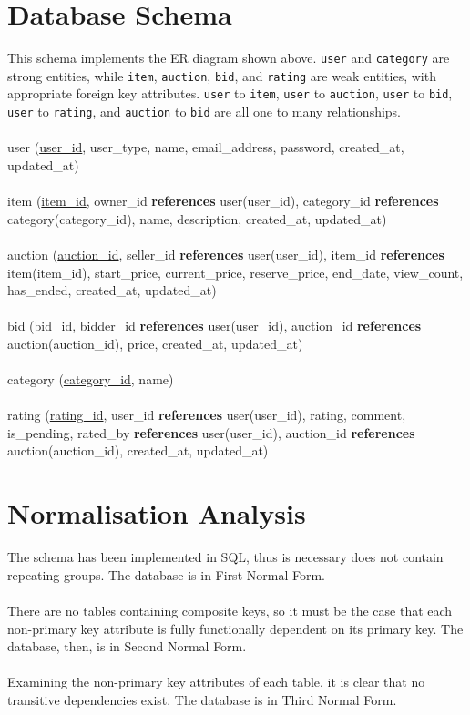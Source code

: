 \documentclass{article}
\begin{document}
\section{Database Schema}

This schema implements the ER diagram shown above. \texttt{user} and \texttt{category} are strong entities, while \texttt{item}, \texttt{auction}, \texttt{bid}, and \texttt{rating} are weak entities, with appropriate foreign key attributes. \texttt{user} to \texttt{item}, \texttt{user} to \texttt{auction}, \texttt{user} to \texttt{bid}, \texttt{user} to \texttt{rating}, and \texttt{auction} to \texttt{bid} are all one to many relationships.\\
\\
user (\underline{user\_id}, user\_type, name, email\_address, password, created\_at, updated\_at)\\
\\
item (\underline{item\_id}, owner\_id \textbf{references} user(user\_id), category\_id \textbf{references} category(category\_id), name, description, created\_at, updated\_at)\\
\\
auction (\underline{auction\_id}, seller\_id \textbf{references} user(user\_id), item\_id \textbf{references} item(item\_id), start\_price, current\_price, reserve\_price, end\_date, view\_count, has\_ended, created\_at, updated\_at)\\
\\
bid (\underline{bid\_id}, bidder\_id \textbf{references} user(user\_id), auction\_id \textbf{references} auction(auction\_id), price, created\_at, updated\_at)\\
\\
category (\underline{category\_id}, name)\\
\\
rating (\underline{rating\_id}, user\_id \textbf{references} user(user\_id), rating, comment, is\_pending, rated\_by \textbf{references} user(user\_id), auction\_id \textbf{references} auction(auction\_id), created\_at, updated\_at)

\section{Normalisation Analysis}

The schema has been implemented in SQL, thus is necessary does not contain repeating groups. The database is in First Normal Form.\\
\\
There are no tables containing composite keys, so it must be the case that each non-primary key attribute is fully functionally dependent on its primary key. The database, then, is in Second Normal Form.\\
\\
Examining the non-primary key attributes of each table, it is clear that no transitive dependencies exist. The database is in Third Normal Form.
\end{document}
